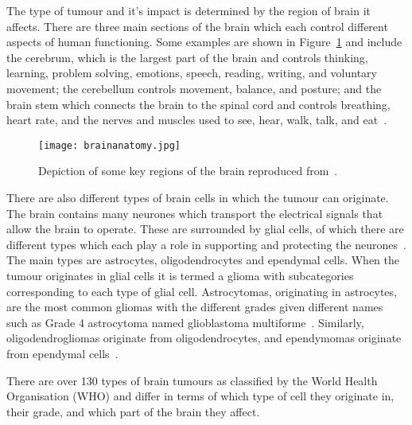 The type of tumour and it's impact is determined by the region of brain it affects. There are three main sections of the brain which each control different aspects of human functioning. Some examples are shown in Figure~\ref{fig:anatomybrain} and include the cerebrum, which is the largest part of the brain and controls thinking, learning, problem solving, emotions, speech, reading, writing, and voluntary movement; the cerebellum controls movement, balance, and posture; and the brain stem which connects the brain to the spinal cord and controls breathing, heart rate, and the nerves and muscles used to see, hear, walk, talk, and eat~\citep{Institute2023}.
\begin{figure}[ht]
    \centering
    \texttt{[image: brainanatomy.jpg]}
    \caption{Depiction of some key regions of the brain reproduced from~\citep{Institute2023}.}
    \label{fig:anatomybrain}
\end{figure}
There are also different types of brain cells in which the tumour can originate. The brain contains many neurones which transport the electrical signals that allow the brain to operate. These are surrounded by glial cells, of which there are different types which each play a role in supporting and protecting the neurones~\citep{TheBrainTumourCharity2023}. The main types are astrocytes, oligodendrocytes and ependymal cells. When the tumour originates in glial cells it is termed a glioma with subcategories corresponding to each type of glial cell. Astrocytomas, originating in astrocytes, are the most common gliomas with the different grades given different names such as Grade 4 astrocytoma named glioblastoma multiforme~\citep{BrainTumourResearch2023}. Similarly, oligodendrogliomas originate from oligodendrocytes, and ependymomas originate from ependymal cells~\citep{TheBrainTumourCharity2023}. %

There are over 130 types of brain tumours as classified by the World Health Organisation (WHO) and differ in terms of which type of cell they originate in, their grade, and which part of the brain they affect.

